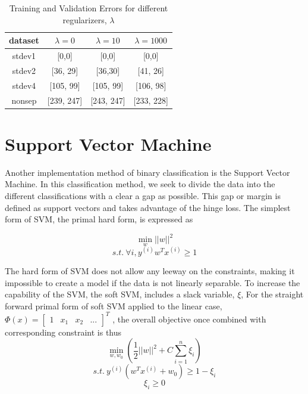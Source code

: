 \documentclass[12pt, twocolumn]{article}
\begin{document}
 \begin{table}
 \caption{ Training and Validation Errors for different regularizers, $\lambda$}
  \begin{tabular}{ | c | c | c | c |}
 \hline
 dataset &$ \lambda=0 $& $\lambda=10$ & $\lambda=1000$ \\ \hline 
 stdev1 & [0,0] & [0,0] & [0,0] \\ \hline
 stdev2 & [36, 29] & [36,30] & [41, 26] \\ \hline
 stdev4 & [105, 99] & [105, 99] & [106, 98] \\ \hline 
 nonsep & [239, 247] & [243, 247] & [233, 228] \\ \hline
 \end{tabular}
 \label{LR error}
\end{table}
 
 
 
 \section{Support Vector Machine}
 
 Another implementation method of binary classification is the Support Vector Machine. In this classification method, we seek to divide the data into the different classifications with a clear a gap as possible. This gap or margin is defined as support vectors and takes advantage of the hinge loss.  The simplest form of SVM, the primal hard form, is expressed as 

 \begin{equation}
\min_w ||w||^2
\end{equation}
\begin{equation}
s.t. \: \forall i, y^{(i)}w^T x^{(i)} \geq 1 
 \end{equation}
    
 The hard form of SVM does not allow any leeway on the constraints, making it impossible to create a model if the data is not linearly separable. To increase the capability of the SVM, the soft SVM, includes a slack variable, $\xi$, For the straight forward primal form of soft SVM applied to the linear case,  $\Phi(x)= \begin{bmatrix} 1 & x _1 & x_2 & ... \end{bmatrix}^T$ , the overall objective once combined with corresponding constraint is thus
 \begin{equation}
 \min_{w, w_0} (\frac{1}{2} ||w||^2 + C \sum_{i=1}^n \xi_i)
 \end{equation}
 \begin{equation}
 s.t. \: y^{(i)}(w^Tx^{(i)} + w_0) \geq 1 -\xi_i
 \end{equation}   
 \begin{equation}
 \xi_i \geq 0
 \end{equation}
    
\end{document}
